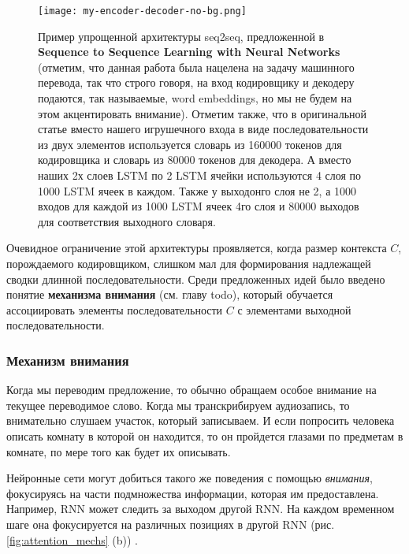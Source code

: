\begin{figure}[h!]
    \centering
    \texttt{[image: my-encoder-decoder-no-bg.png]}
    \caption{Пример упрощенной архитектуры seq2seq, предложенной в 
    \textbf{Sequence to Sequence Learning with Neural Networks} \cite{seq2seq} 
    (отметим, 
    что данная работа была нацелена на задачу машинного перевода, так 
    что строго говоря, на вход кодировщику и декодеру подаются, 
    так называемые, word embeddings, но мы не будем на этом акцентировать внимание). 
    Отметим также, что в оригинальной статье вместо нашего игрушечного входа в виде 
    последовательности из двух элементов используется словарь из 160000 токенов 
    для кодировщика и словарь из 80000 токенов для декодера. А вместо наших 
    2х слоев LSTM по 2 LSTM ячейки используются 4 слоя по 1000 LSTM ячеек в 
    каждом. Также у выходонго слоя не 2, а 1000 входов для каждой из 1000 LSTM 
    ячеек 4го слоя и 80000 выходов для соответствия выходного словаря.}
    \label{fig:my-encoder-decoder}
\end{figure}

\newpage

Очевидное ограничение этой архитектуры проявляется, когда размер контекста $C$,
порождаемого кодировщиком, слишком мал для формирования надлежащей сводки
длинной последовательности. Среди предложенных идей было введено понятие 
\textbf{механизма внимания} (см. главу {\color{red} todo}), 
который обучается ассоциировать элементы 
последовательности $C$ с элементами выходной последовательности.

\subsubsection{Механизм внимания}

Когда мы переводим предложение, то обычно обращаем особое внимание на текущее 
переводимое слово. Когда мы транскрибируем аудиозапись, то внимательно слушаем 
участок, который записываем. И если попросить человека описать комнату в которой он 
находится, то он пройдется глазами по предметам в комнате, 
по мере того как будет их описывать.

Нейронные сети могут добиться такого же поведения с помощью \textit{внимания}, 
фокусируясь на части подмножества информации, которая им предоставлена. 
Например, RNN может следить за выходом другой RNN. На каждом временном шаге 
она фокусируется на различных позициях в другой RNN (рис. \ref{fig:attention_mechs} (b)) 
\cite{olah2016attention}.

